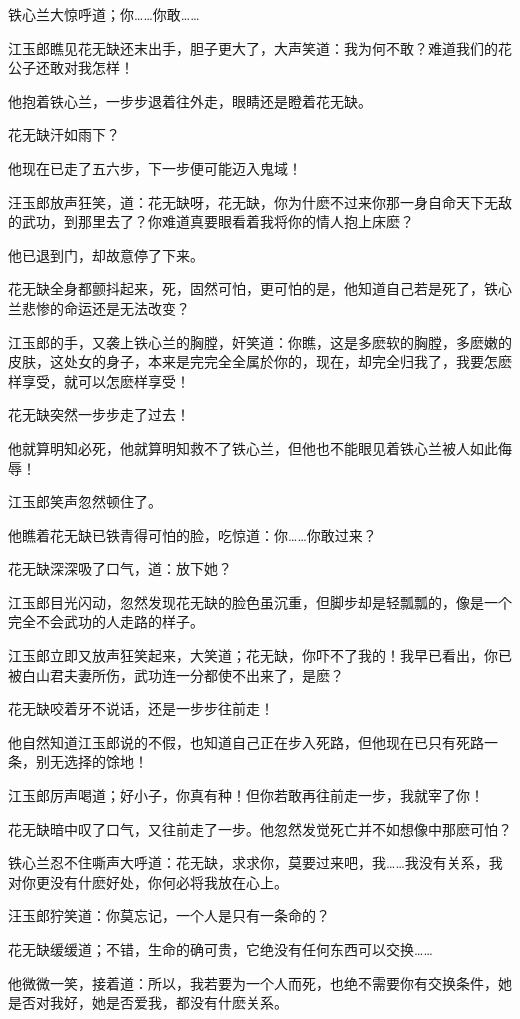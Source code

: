 \documentclass[12pt,oneside]{book}
\begin{document}
铁心兰大惊呼道；你\ldots\ldots 你敢\ldots\ldots{}

江玉郎瞧见花无缺还末出手，胆子更大了，大声笑道：我为何不敢？难道我们的花公子还敢对我怎样！

他抱着铁心兰，一步步退着往外走，眼睛还是瞪着花无缺。

花无缺汗如雨下？

他现在已走了五六步，下一步便可能迈入鬼域！

汪玉郎放声狂笑，道：花无缺呀，花无缺，你为什麽不过来你那一身自命天下无敌的武功，到那里去了？你难道真要眼看着我将你的情人抱上床麽？

他已退到门，却故意停了下来。

花无缺全身都颤抖起来，死，固然可怕，更可怕的是，他知道自己若是死了，铁心兰悲惨的命运还是无法改变？

江玉郎的手，又袭上铁心兰的胸膛，奸笑道：你瞧，这是多麽软的胸膛，多麽嫩的皮肤，这处女的身子，本来是完完全全属於你的，现在，却完全归我了，我要怎麽样享受，就可以怎麽样享受！

花无缺突然一步步走了过去！

他就算明知必死，他就算明知救不了铁心兰，但他也不能眼见着铁心兰被人如此侮辱！

江玉郎笑声忽然顿住了。

他瞧着花无缺已铁青得可怕的脸，吃惊道：你\ldots\ldots 你敢过来？

花无缺深深吸了口气，道：放下她？

江玉郎目光闪动，忽然发现花无缺的脸色虽沉重，但脚步却是轻瓢瓢的，像是一个完全不会武功的人走路的样子。

江玉郎立即又放声狂笑起来，大笑道；花无缺，你吓不了我的！我早已看出，你已被白山君夫妻所伤，武功连一分都使不出来了，是麽？

花无缺咬着牙不说话，还是一步步往前走！

他自然知道江玉郎说的不假，也知道自己正在步入死路，但他现在已只有死路一条，别无选择的馀地！

江玉郎厉声喝道；好小子，你真有种！但你若敢再往前走一步，我就宰了你！

花无缺暗中叹了口气，又往前走了一步。他忽然发觉死亡并不如想像中那麽可怕？

铁心兰忍不住嘶声大呼道：花无缺，求求你，莫要过来吧，我\ldots\ldots 我没有关系，我对你更没有什麽好处，你何必将我放在心上。

汪玉郎狞笑道：你莫忘记，一个人是只有一条命的？

花无缺缓缓道；不错，生命的确可贵，它绝没有任何东西可以交换\ldots\ldots{}

他微微一笑，接着道：所以，我若要为一个人而死，也绝不需要你有交换条件，她是否对我好，她是否爱我，都没有什麽关系。
\end{document}
